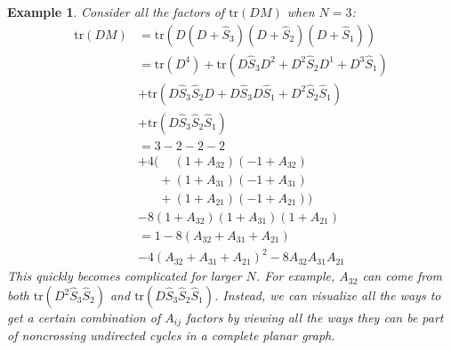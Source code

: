 \documentclass[english,master]{liumaiex}
\theoremstyle{thesisplain}
\theoremstyle{thesisdefinition}
\newtheorem{example}[proposition]{Example}
\newcommand{\tr}{\text{tr}}
\numberwithin{equation}{section}
\newcommand{\dotangle}[1]{
    (360/\n * (#1) + 90)
}
\newcommand{\dotposition}[1]{
    ({360/\n * (#1) + 90}:\radius)
}
\begin{document}
\begin{example}
Consider all the factors of $\tr(DM)$ when $N=3$:
\begin{equation}
\begin{aligned}
	\tr(DM) &= \tr(D(D + \hat{S}_3)(D + \hat{S}_2)(D + \hat{S}_1)) \\
	&= \tr(D^4) + \tr(D\hat{S}_3D^2 + D^2\hat{S}_2D^1 + D^3\hat{S}_1) \\
	&+ \tr(D\hat{S}_3\hat{S}_2D + D\hat{S}_3D\hat{S}_1 + D^2\hat{S}_2\hat{S}_1) \\
	&+ \tr(D\hat{S}_3\hat{S}_2\hat{S}_1) \\
	&= 3 - 2 - 2 - 2 \\
	&+4(           \phantom{+}(1+A_{32})(-1+A_{32})\\
	&\phantom{+4(} + (1+A_{31})(-1+A_{31}) \\
	&\phantom{+4(} + (1+A_{21})(-1+A_{21})) \\
	&-8(1+A_{32})(1+A_{31})(1+A_{21}) \\
	&= 1 - 8(A_{32} + A_{31} + A_{21}) \\
	&- 4(A_{32} + A_{31} + A_{21})^2 -8A_{32}A_{31}A_{21}
\end{aligned}
\end{equation}
This quickly becomes complicated for larger $N$. For example, $A_{32}$ can come from both $\tr(D^2\hat{S}_3\hat{S}_2)$ and $\tr(D\hat{S}_3\hat{S}_2\hat{S}_1)$. Instead, we can visualize all the ways to get a certain combination of $A_{ij}$ factors by viewing all the ways they can be part of noncrossing undirected cycles in a complete planar graph.
\begin{center}
\end{center}
\end{example}
\end{document}
